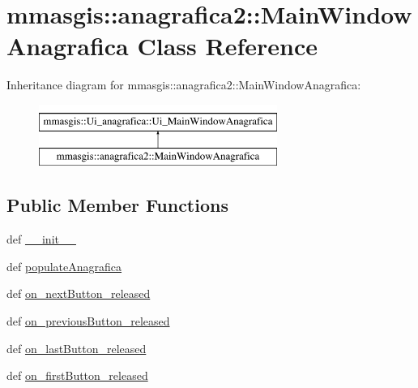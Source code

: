 \hypertarget{classmmasgis_1_1anagrafica2_1_1MainWindowAnagrafica}{
\section{mmasgis::anagrafica2::MainWindowAnagrafica Class Reference}
\label{classmmasgis_1_1anagrafica2_1_1MainWindowAnagrafica}
}
Inheritance diagram for mmasgis::anagrafica2::MainWindowAnagrafica:\begin{figure}[H]
\begin{center}
\leavevmode
\includegraphics[height=2.000000cm]{classmmasgis_1_1anagrafica2_1_1MainWindowAnagrafica}
\end{center}
\end{figure}
\subsection*{Public Member Functions}
\begin{DoxyCompactItemize}
\item 
def \hyperlink{classmmasgis_1_1anagrafica2_1_1MainWindowAnagrafica_a5848f5698551d6a839a4a1d4de41fe4b}{\_\-\_\-init\_\-\_\-}
\item 
def \hyperlink{classmmasgis_1_1anagrafica2_1_1MainWindowAnagrafica_abccd4ad7fed6d37a6057d3b8da274563}{populateAnagrafica}
\item 
def \hyperlink{classmmasgis_1_1anagrafica2_1_1MainWindowAnagrafica_ac7c414543b897586045204c7b7357ea2}{on\_\-nextButton\_\-released}
\item 
def \hyperlink{classmmasgis_1_1anagrafica2_1_1MainWindowAnagrafica_aeebc76e188b6db54c9cc9bd93c4f7944}{on\_\-previousButton\_\-released}
\item 
def \hyperlink{classmmasgis_1_1anagrafica2_1_1MainWindowAnagrafica_ad85d118ba2f12b6ad623168eb6280842}{on\_\-lastButton\_\-released}
\item 
def \hyperlink{classmmasgis_1_1anagrafica2_1_1MainWindowAnagrafica_a55c0f7af241fb41488e4ba25908bb4a5}{on\_\-firstButton\_\-released}
\end{DoxyCompactItemize}
